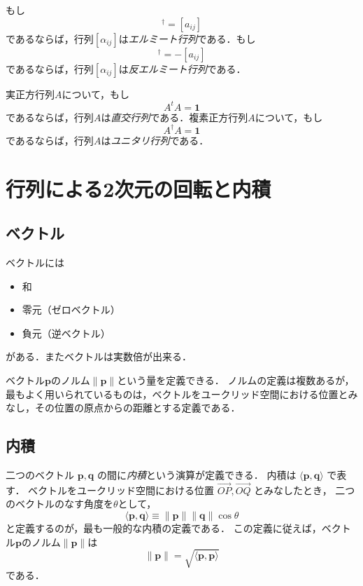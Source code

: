 \documentclass{jsbook}
\newcommand{\keyword}[1]{\emph{#1}}
\newcommand{\One}{\mathbf{1}}
\newcommand{\norm}[1]{\|{#1}\|}
\newcommand{\bvec}[1]{\boldsymbol{#1}}
\begin{document}
もし
\begin{equation}
[a_{ij}]^\dagger=[a_{ij}]
\end{equation}
であるならば，行列$[\alpha_{ij}]$は\keyword{エルミート行列}である．もし
\begin{equation}
[a_{ij}]^\dagger=-[a_{ij}]
\end{equation}
であるならば，行列$[\alpha_{ij}]$は\keyword{反エルミート行列}である．

実正方行列$A$について，もし
\begin{equation}
A^tA=\One
\end{equation}
であるならば，行列$A$は\keyword{直交行列}である．複素正方行列$A$について，もし
\begin{equation}
A^\dagger A=\One
\end{equation}
であるならば，行列$A$は\keyword{ユニタリ行列}である．


\section{行列による2次元の回転と内積}

\subsection{ベクトル}

ベクトルには
\begin{itemize}
\item 和
\item 零元（ゼロベクトル）
\item 負元（逆ベクトル）
\end{itemize}
がある．またベクトルは実数倍が出来る．

ベクトル$\bvec{p}$のノルム$\norm{\bvec{p}}$という量を定義できる．
ノルムの定義は複数あるが，最もよく用いられているものは，ベクトルをユークリッド空間における位置とみなし，その位置の原点からの距離とする定義である．

\subsection{内積}

二つのベクトル $\bvec{p},\bvec{q}$ の間に\keyword{内積}という演算が定義できる．
内積は $\langle\bvec{p},\bvec{q}\rangle$ で表す．
ベクトルをユークリッド空間における位置 $\overrightarrow{OP},\overrightarrow{OQ}$ とみなしたとき，
二つのベクトルのなす角度を$\theta$として，
\begin{equation}
\langle\bvec{p},\bvec{q}\rangle\equiv\norm{\bvec{p}}\norm{\bvec{q}}\cos\theta
\end{equation}
と定義するのが，最も一般的な内積の定義である．
この定義に従えば，ベクトル$\bvec{p}$のノルム$\norm{\bvec{p}}$は
\begin{equation}
\norm{\bvec{p}}=\sqrt{\langle\bvec{p},\bvec{p}\rangle}
\end{equation}
である．
\end{document}
